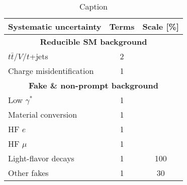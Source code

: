 \documentclass[../thesis.tex]{subfiles}
\begin{document}
\begin{table}[!ht]
  \caption{\label{tab:syst_bg}Caption}
  \begin{center}
    \begin{tabular}{lcc}
      \toprule \midrule
      Systematic uncertainty	& Terms     & Scale [\%] \\
      \midrule
      \multicolumn{3}{c}{\textbf{Reducible SM background}}  \\
      \midrule
      $t\bar{t}/V/t$+jets & 2 & \\
      Charge misidentification & 1 & \\
      \midrule
      \multicolumn{3}{c}{\textbf{Fake \& non-prompt background}}  \\
      \midrule
      Low $\gamma^{*}$ & 1 & \\
      Material conversion & 1 & \\
      HF $e$ & 1 & \\
      HF $\mu$ & 1 & \\
      Light-flavor decays & 1 & 100 \\
      Other fakes & 1 & 30 \\
      \bottomrule
    \end{tabular}
  \end{center}
\end{table}
\end{document}
